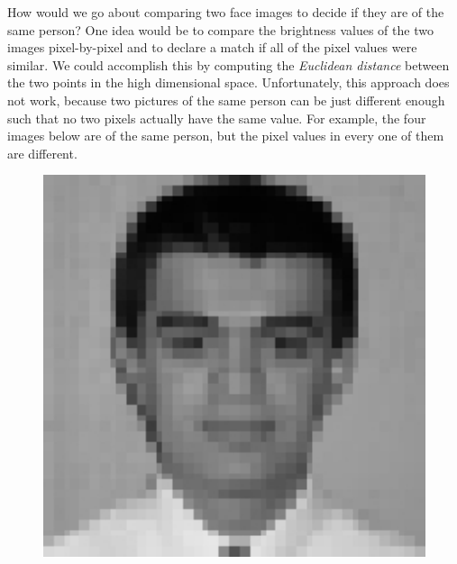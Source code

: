 How would we go about comparing two face images to decide if they are of the same person? One idea would be to compare the brightness values of the two images pixel-by-pixel and to declare a match if all of the pixel values were similar. We could accomplish this by computing the \emph{Euclidean distance} between the two points in the high dimensional space. Unfortunately, this approach does not work, because two pictures of the same person can be just different enough such that no two pixels actually have the same value. For example, the four images below are of the same person, but the pixel values in every one of them are different. \\
	\begin{figure}[H]
	  \centering
	  \begin{minipage}[b]{0.2\textwidth}
	    \includegraphics[width=1.08\textwidth]{season3/304/images/face1.jpg}
	  \end{minipage}
	\hspace{0.2cm}
	  \begin{minipage}[b]{0.2\textwidth}

\end{minipage}
\end{figure}
